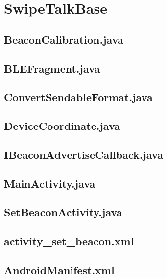 \documentclass[11pt,a4j]{jarticle}
\begin{document}
\section{SwipeTalkBase}
\subsection{BeaconCalibration.java}
	
	\newpage
\subsection{BLEFragment.java}
	
	\newpage
\subsection{ConvertSendableFormat.java}
	
	\newpage
\subsection{DeviceCoordinate.java}
	
	\newpage
\subsection{IBeaconAdvertiseCallback.java}
	
	\newpage
\subsection{MainActivity.java}
	
	\newpage
\subsection{SetBeaconActivity.java}
	
	\newpage


\subsection{activity\_set\_beacon.xml}
	
	\newpage
\subsection{AndroidManifest.xml}
	
	\newpage
\end{document}
